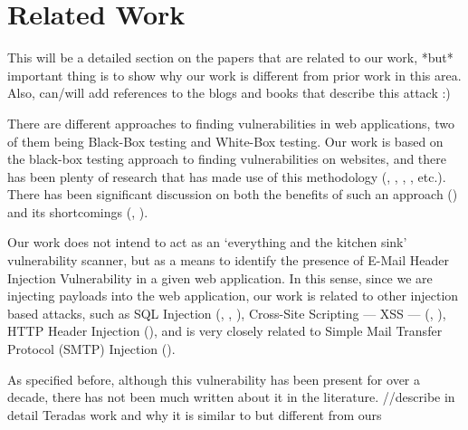 \chapter{Related Work}
This will be a detailed section on the papers that are related to our work, *but* important thing is to show why our work is different from prior work in this area.
Also, can/will add references to the blogs and books that describe this attack :)

There are different approaches to finding vulnerabilities in web applications, two of them being Black-Box testing and White-Box testing.
Our work is based on the black-box testing approach to finding vulnerabilities on websites, and there has been plenty of research that has made use of this methodology (\cite{Beizer:1995:BTT:202699}, \cite{Huang}, \cite{zanero2005automatic}, \cite{kals2006secubat}, \cite{payet13:ears-in-the-wild} etc.). There has been significant discussion on both the benefits of such an approach (\cite{black-box}) and its shortcomings (\cite{Doupe2010}, \cite{Doupe2012}).

Our work does not intend to act as an `everything and the kitchen sink' vulnerability scanner, but as a means to identify the presence of E-Mail Header Injection Vulnerability in a given web application. In this sense, since we are injecting payloads into the web application, our work is related to other injection based attacks, such as SQL Injection (\cite{sql0}, \cite{sql1}, \cite{sql2}), Cross-Site Scripting --- XSS --- (\cite{Injection1}, \cite{KleinAmit}), HTTP Header Injection (\cite{sessionride}), and is very closely related to Simple Mail Transfer Protocol (SMTP) Injection (\cite{Terada2015}).

As specified before, although this vulnerability has been present for over a decade, there has not been much written about it in the literature. 
//describe in detail Teradas work and why it is similar to but different from ours